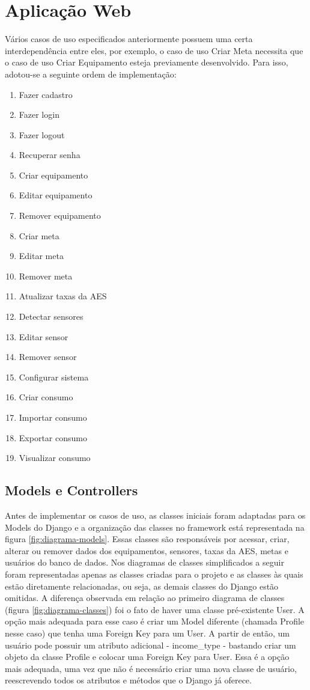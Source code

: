 \section{Aplicação Web}
\label{Sec:5-aplicativo-web}

Vários casos de uso especificados anteriormente possuem uma certa interdependência entre eles, por exemplo, o caso de uso Criar Meta necessita que o caso de uso Criar Equipamento esteja previamente desenvolvido. Para isso, adotou-se a seguinte ordem de implementação:

\begin{enumerate}
	\item{Fazer cadastro}
	\item{Fazer login}
	\item{Fazer logout}
	\item{Recuperar senha}
	\item{Criar equipamento}
	\item{Editar equipamento}
	\item{Remover equipamento}
	\item{Criar meta}
	\item{Editar meta}
	\item{Remover meta}
	\item{Atualizar taxas da AES}
	\item{Detectar sensores}
	\item{Editar sensor}
	\item{Remover sensor}
	\item{Configurar sistema}
	\item{Criar consumo}
	\item{Importar consumo}
	\item{Exportar consumo}
	\item{Visualizar consumo}
\end{enumerate}

\subsection{Models e Controllers}

Antes de implementar os casos de uso, as classes iniciais foram adaptadas para os Models do Django e a organização das classes no framework está representada na figura \ref{fig:diagrama-models}. Essas classes são responsáveis por acessar, criar, alterar ou remover dados dos equipamentos, sensores, taxas da AES, metas e usuários do banco de dados. Nos diagramas de classes simplificados a seguir foram representadas apenas as classes criadas para o projeto e as classes às quais estão diretamente relacionadas, ou seja, as demais classes do Django estão omitidas. A diferença observada em relação ao primeiro diagrama de classes (figura \ref{fig:diagrama-classes}) foi o fato de haver uma classe pré-existente User. A opção mais adequada para esse caso é criar um Model diferente (chamada Profile nesse caso) que tenha uma Foreign Key para um User. A partir de então, um usuário pode possuir um atributo adicional - income\_type - bastando criar um objeto da classe Profile e colocar uma Foreign Key para User. Essa é a opção mais adequada, uma vez que não é necessário criar uma nova classe de usuário, reescrevendo todos os atributos e métodos que o Django já oferece.

